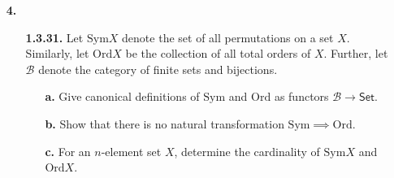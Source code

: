 \documentclass[ 12pt ]{article}
\begin{document}
\begin{enumerate}
		\begin{proof}
			Let $\mathscr{C}$ be an arbitrary category. Define a functor $F : [\mathbb{2}, \mathscr{C}] \to \mathscr{C} \times \mathscr{C}$ with the following object and morphism maps
			\begin{align*}
				G : \mathbb{2} \to \mathscr{C} &\longmapsto (G0, G1), \\
				\eta : G \implies H &\longmapsto (\eta_0 : G0 \to H0,\, \eta_1 : G1 \to H1)\; \mathrm{for\; all}\; G, H : \mathbb{2} \to \mathscr{C}
			\end{align*}
			where $0, 1 \in \mathbb{2}$. Indeed, $F$ is a functor, observe that
			\begin{align*}
				F\, \mathrm{Id}_G &= (\mathrm{id}_{G0}, \mathrm{id}_{G1}) = \mathrm{id}_{(G0, G1)}, \\
				F \eta \epsilon &= (\eta_0 \epsilon_0, \eta_1 \epsilon_1) = (\eta_0, \eta_1)\, (\epsilon_0, \epsilon_1) = F \eta\, F \epsilon.
			\end{align*}
			Since $\mathbb{2}$ has no morphisms other than identities, the object map of each functor $G : \mathbb{2} \to \mathscr{C}$ uniquely defines $G$ and so the object map of $F$ is bijective. Similarly, a natural transformation is uniquely defined by its components, hence the morphisms map of $F$ is also bijective. Thus, $[\mathbb{2}, \mathscr{C}] \cong \mathscr{C} \times \mathscr{C}$ by \textbf{2}.
		\end{proof}


	\item[\textbf{4.}] $ $
		\begin{enumerate}
			\item[\textbf{1.3.31.}] Let $\mathrm{Sym} X$ denote the set of all permutations on a set $X$. Similarly, let $\mathrm{Ord} X$ be the collection of all total orders of $X$. Further, let $\mathscr{B}$ denote the category of finite sets and bijections.
			\begin{enumerate}
				\item[\textbf{a.}] Give canonical definitions of $\mathrm{Sym}$ and $\mathrm{Ord}$ as functors $\mathscr{B} \to \mathsf{Set}$.
				\item[\textbf{b.}] Show that there is no natural transformation $\mathrm{Sym} \implies \mathrm{Ord}$.
				\item[\textbf{c.}] For an $n$-element set $X$, determine the cardinality of $\mathrm{Sym} X$ and $\mathrm{Ord} X$.
			\end{enumerate}


\end{enumerate}
\end{enumerate}
\end{document}
